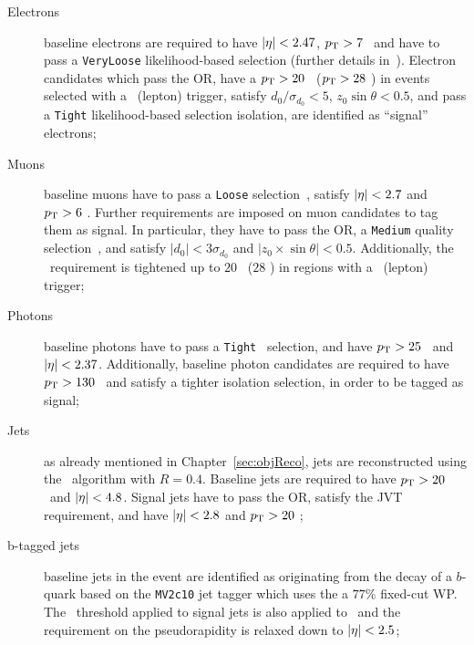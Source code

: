 		\begin{description}
			\item[Electrons] 
				baseline electrons are required to have $|\eta| < 2.47$, $p_{\mathrm{T}} > 7$ \GeV\ and have to pass a \texttt{VeryLoose} likelihood-based selection (further details in~\cite{egamma, egamma2}). Electron candidates which pass the \ac{OR}, have a $p_{\mathrm{T}} > 20$ \gev\ ($p_{\mathrm{T}} > 28$ \GeV) in events selected with a \met\ (lepton) trigger, satisfy $d_0/\sigma_{d_{0}} < 5$, $z_0 \sin \theta < 0.5$, and pass a \texttt{Tight} likelihood-based selection isolation, are identified as ``signal'' electrons;

			\item[Muons] 	
				baseline muons have to pass a \texttt{Loose} selection~\cite{PERF-2015-10}, satisfy $|\eta| < 2.7$ and $p_{\mathrm{T}} > 6$ \GeV. Further requirements are imposed on muon candidates to tag them as signal. In particular, they have to pass the \ac{OR}, a \texttt{Medium} quality selection~\cite{PERF-2015-10}, and satisfy
				$|d_0|< 3 \sigma_{d_0}$ and $|z_0 \times \sin \theta |<0.5$. Additionally, the \pt\ requirement is tightened up to $20$ \gev\ ($28$ \GeV) in regions with a \met\ (lepton) trigger;

			\item[Photons]
				baseline photons have to pass a \texttt{Tight}~\cite{Aaboud:2016yuq} selection, and have $p_{\mathrm{T}} > 25$ \GeV\ and $|\eta| < 2.37$. Additionally, baseline photon candidates are required to have $p_{\mathrm{T}} > 130$ \GeV\ and satisfy a tighter isolation selection, in order to be tagged as signal;
			
			\item[Jets]
				as already mentioned in Chapter~\ref{sec:objReco}, jets are reconstructed using the \antikt\ algorithm with $R=0.4$. Baseline jets are required to have $p_{\mathrm{T}}>20$ \GeV\ and $|\eta|< 4.8$. Signal jets have to pass the \ac{OR}, satisfy the \ac{JVT} requirement, and have $|\eta| < 2.8$ and $p_{\mathrm{T}} > 20$ \GeV;

			\item[b-tagged jets]
				baseline jets in the event are identified as originating from the decay of a $b$-quark based on the \texttt{MV2c10} jet tagger which uses the a $77\%$ fixed-cut WP. The \pt\ threshold applied to signal jets is also applied to \bjs\ and the requirement on the pseudorapidity is relaxed down to $|\eta| < 2.5$;
			

\end{description}
